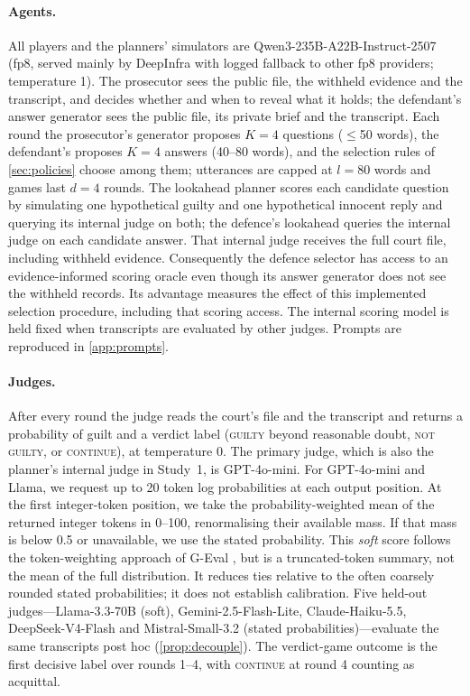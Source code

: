 \documentclass[10pt,a4paper]{article}
\theoremstyle{remark}
\begin{document}
\paragraph{Agents.} All players and the planners' simulators are Qwen3-235B-A22B-Instruct-2507 (fp8, served mainly by
DeepInfra with logged fallback to other fp8 providers; temperature 1). The prosecutor sees the public file, the withheld evidence and the transcript, and decides whether and
when to reveal what it holds; the defendant's answer generator sees the public file, its private brief and the transcript. Each round the
prosecutor's generator proposes $K=4$ questions ($\le$50 words), the defendant's proposes $K=4$ answers (40--80
words), and the selection rules of \cref{sec:policies} choose among them; utterances are capped at $l=80$ words and
games last $d=4$ rounds. The lookahead planner scores each candidate question by simulating one hypothetical guilty and
one hypothetical innocent reply and querying its internal judge on both; the defence's lookahead queries the internal
judge on each candidate answer. That internal judge receives the full court file, including withheld evidence.
Consequently the defence selector has access to an evidence-informed scoring oracle even though its answer generator
does not see the withheld records. Its advantage measures the effect of this implemented selection procedure,
including that scoring access. The internal scoring model is held fixed when transcripts are evaluated by other
judges. Prompts are reproduced in \cref{app:prompts}.

\paragraph{Judges.} After every round the judge reads the court's file and the transcript and returns a probability of
guilt and a verdict label (\textsc{guilty} beyond reasonable doubt, \textsc{not guilty}, or \textsc{continue}), at
temperature 0. The primary judge, which is also the planner's internal judge in Study~1, is GPT-4o-mini. For GPT-4o-mini and Llama, we request up to 20 token log probabilities at each output position. At the first
integer-token position, we take the probability-weighted mean of the returned integer tokens in 0--100,
renormalising their available mass. If that mass is below 0.5 or unavailable, we use the stated probability.
This \emph{soft} score follows the token-weighting approach of G-Eval \citep{liu2023geval}, but is a truncated-token
summary, not the mean of the full distribution. It reduces ties relative to the often coarsely rounded stated
probabilities; it does not establish calibration. Five held-out judges---Llama-3.3-70B (soft),
Gemini-2.5-Flash-Lite, Claude-Haiku-5.5, DeepSeek-V4-Flash and Mistral-Small-3.2 (stated probabilities)---evaluate the
same transcripts post hoc (\cref{prop:decouple}). The verdict-game outcome is the first decisive label over rounds
1--4, with \textsc{continue} at round 4 counting as acquittal.
\end{document}
